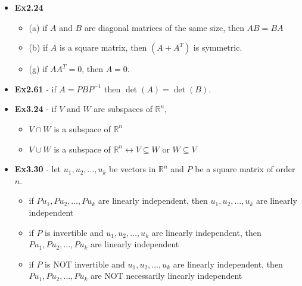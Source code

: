 \documentclass[10pt, portrait]{article}
\let\iff\leftrightarrow
\begin{document}
\raggedright
\footnotesize


\setlength{\columnseprule}{0.25pt}
\setlength{\premulticols}{1pt}
\setlength{\postmulticols}{1pt}
\setlength{\multicolsep}{1pt}
\setlength{\columnsep}{2pt}

\begin{center}
\end{center}


\begin{itemize}
    \item \textbf{Ex2.24} 
    \begin{itemize}
        \item (a) if $A$ and $B$ are diagonal matrices of the same size, then $AB = BA$
        \item (b) if $A$ is a square matrix, then $(A+A^T)$ is symmetric.
        \item (g) if $AA^T=0$, then $A=0$.
    \end{itemize}
    \item \textbf{Ex2.61} - if $A=PBP^{-1}$ then $\det(A)=\det(B)$.
    \item \textbf{Ex3.24} - if $V$ and $W$ are subspaces of $\mathbb{R}^n$,
    \begin{itemize}
        \item $V \cap W$ is a subspace of $\mathbb{R}^n$
        \item $V \cup W$ is a subspace of $\mathbb{R}^n \iff V \subseteq W$ or $W \subseteq V$
    \end{itemize}
    \item \textbf{Ex3.30} - let $u_1, u_2, \dots, u_k$ be vectors in $\mathbb{R}^n$ and $P$ be a square matrix of order $n$.
    \begin{itemize}
        \item if $Pu_1, Pu_2, \dots, Pu_k$ are linearly independent, then $u_1, u_2, \dots, u_k$ are linearly independent
        \item if $P$ is invertible and $u_1, u_2, \dots, u_k$ are linearly independent, then $Pu_1, Pu_2, \dots, Pu_k$ are linearly independent
        \item if $P$ is NOT invertible and $u_1, u_2, \dots, u_k$ are linearly independent, then $Pu_1, Pu_2, \dots, Pu_k$ are NOT necessarily linearly independent

\end{itemize}
\end{itemize}
\end{document}
